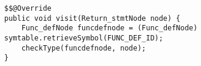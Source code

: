 \begin{lstlisting}[caption={Visit return statement node in return statement visitor}, label={code:ReturnCheck:returnstmt}]
$$@Override
public void visit(Return_stmtNode node) {
    Func_defNode funcdefnode = (Func_defNode) symtable.retrieveSymbol(FUNC_DEF_ID);
    checkType(funcdefnode, node);
}
\end{lstlisting}